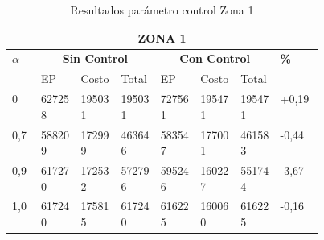 \documentclass[conference]{IEEEtran}
\begin{document}
\begin{table*}[t]
\caption{Resultados par\'ametro control Zona 1}
\centering
\begin{tabular}{|p{0.03\linewidth}|p{0.06\linewidth}|p{0.06\linewidth}|p{0.06\linewidth}|p{0.06\linewidth}|p{0.06\linewidth}|p{0.06\linewidth}|p{0.06\linewidth}|}
\hline
\multicolumn{8}{|c|}{\textbf{ZONA 1}} \\ 
\hline

\multirow{2}{*}{\textbf{$\alpha$}}  & \multicolumn{3}{|c|}{\textbf{Sin Control}} & \multicolumn{3}{|c|}{\textbf{Con Control}} &  \multirow{2}{*}{\textbf{\%}} \\

\cline{2-7}
 & EP & Costo & Total & EP & Costo & Total &  \\
\hline
0 & 627258 & 195031 & 195031 & 727561 & 195471 & 195471 & +0,19 \\
\hline
0,7 & 588209 & 172999 & 463646 & 583547 & 177001 & 461583 & -0,44 \\ 
\hline
0,9 & 617270 & 172532 & 572796 & 595246 & 160227 & 551744 & -3,67 \\
\hline
1,0 & 617240 & 175815 & 617240 & 616225 & 160060 & 616225 & -0,16\\ 
\hline
\end{tabular}
\end{table*}
\end{document}
